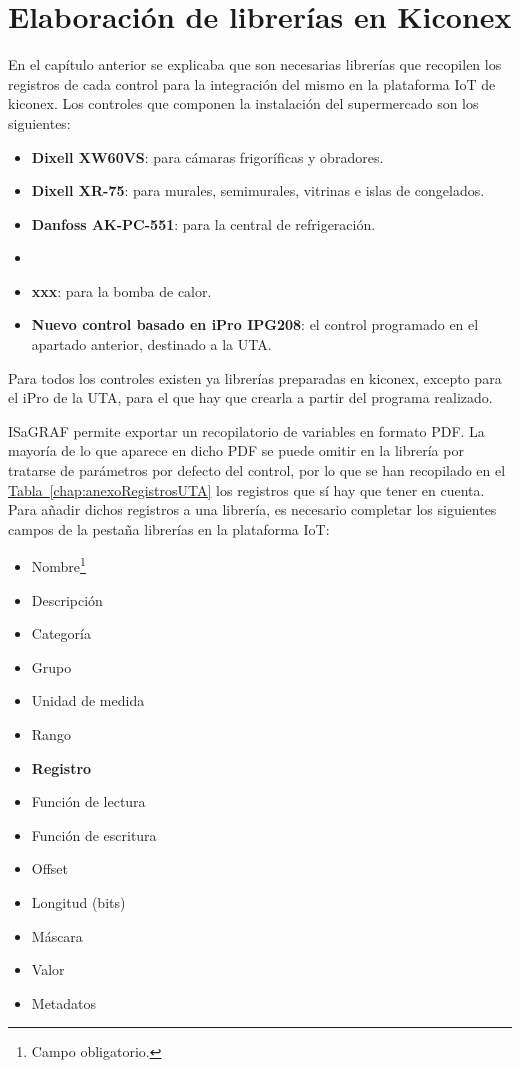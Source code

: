 \section{Elaboración de librerías en Kiconex}
\label{sec:librerias}
En el capítulo anterior se explicaba que son necesarias librerías que recopilen los registros de cada control para la integración del mismo en la plataforma IoT de kiconex. Los controles que componen la instalación del supermercado son los siguientes:

\begin{itemize}
  \item \textbf{Dixell XW60VS}: para cámaras frigoríficas y obradores.
  \item \textbf{Dixell XR-75}: para murales, semimurales, vitrinas e islas de congelados.
  \item \textbf{Danfoss AK-PC-551}: para la central de refrigeración.
  \item \item \textbf{xxx}: para la bomba de calor.
  \item \textbf{Nuevo control basado en iPro IPG208}: el control programado en el apartado anterior, destinado a la UTA.
\end{itemize}

Para todos los controles existen ya librerías preparadas en kiconex, excepto para el iPro de la UTA, para el que hay que crearla a partir del programa realizado. 

ISaGRAF permite exportar un recopilatorio de variables en formato PDF. La mayoría de lo que aparece en dicho PDF se puede omitir en la librería por tratarse de parámetros por defecto del control, por lo que se han recopilado en el \hyperref[chap:anexoRegistrosUTA]{Tabla~\ref{chap:anexoRegistrosUTA}} los registros que sí hay que tener en cuenta. Para añadir dichos registros a una librería, es necesario completar los siguientes campos de la pestaña librerías en la plataforma IoT:

\begin{itemize}
  \item Nombre\footnote[1]{Campo obligatorio.}
  \item Descripción\footnotemark[1]
  \item Categoría\footnotemark[1]
  \item Grupo
  \item Unidad de medida
  \item Rango
  \item \textbf{Registro\footnotemark[1]}
  \item Función de lectura
  \item Función de escritura
  \item Offset
  \item Longitud (bits)\footnotemark[1]
  \item Máscara
  \item Valor
  \item Metadatos
\end{itemize}

